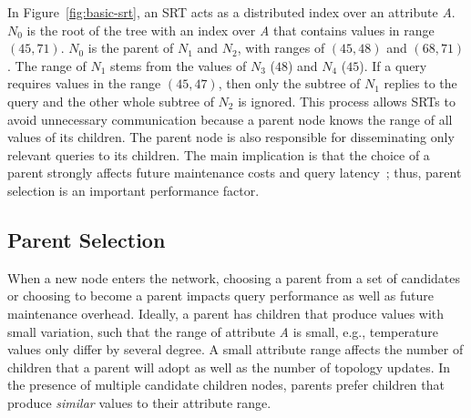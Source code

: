 In Figure~\ref{fig:basic-srt}, an SRT acts as a 
distributed index over an attribute \textit{A}. \textit{$N_{0}$} is the root of the tree with
an index over \textit{A} that contains values in range \textit{$(45, 71)$}.
\textit{$N_{0}$} is the parent of \textit{$N_{1}$} and \textit{$N_{2}$},
with ranges of \textit{$(45, 48)$} and \textit{$(68, 71)$}. 
The range of \textit{$N_{1}$} stems from the values of \textit{$N_{3}$} ($48$) and \textit{$N_{4}$} ($45$).
If a query requires values in the range \textit{$(45, 47)$}, then
only the subtree of \textit{$N_{1}$} replies to the query and the other whole
subtree of \textit{$N_{2}$} is ignored.
This process allows SRTs to avoid unnecessary communication because  
a parent node knows the range of all values of its children. The parent node is also responsible for disseminating only relevant queries to its children. 
The main implication is that the choice of a parent strongly affects future maintenance costs and query latency~\cite{madden2005tinydb}; thus, parent selection is an important performance factor. 
% 

\subsection{Parent Selection} 
\label{subsec::parent}
% 

When a new node enters the network, choosing a parent from a set of candidates or choosing to become a parent impacts query performance as well as future maintenance overhead. 
Ideally, a parent has children that produce values with small variation, such that the range of attribute \textit{A} is small, e.g., temperature values only differ by several degree.
A small attribute range affects the number of children that a parent will adopt as well as the number of topology updates. In the presence of multiple candidate children nodes, parents prefer children that produce \textit{similar} values to their attribute range.

